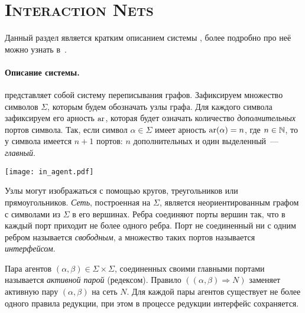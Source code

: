
\section{\texorpdfstring{\textsc{Interaction Nets}}{Interaction Nets}}
\label{sec:ins}

Данный раздел является кратким описанием системы \INs{}, более подробно про неё можно узнать в~\cite{lafontInteractionCombinators1997,satoDesignImplementationLowlevel2015, salikhmetovInteractionNetsRussian2013}.

\paragraph{Описание системы.}

\INs{} представляет собой систему переписывания графов.
Зафиксируем множество символов $\Sigma$, которым будем обозначать узлы графа.
Для каждого символа зафиксируем его арность $\operatorname{ar}$, которая будет означать количество \textit{дополнительных} портов символа.
Так, если символ $\alpha \in \Sigma$ имеет арность $\operatorname{ar}(\alpha) = n$, где $n \in \mathbb{N}$, то у символа имеется $n+1$ портов: $n$ дополнительных и один выделенный~--- \textit{главный}.

\begin{center}
    \texttt{[image: in\_agent.pdf]}
\end{center}

Узлы могут изображаться с помощью кругов, треугольников или прямоугольников.
\textit{Сеть}, построенная на $\Sigma$, является неориентированным графом с символами из $\Sigma$ в его вершинах.
Ребра соединяют порты вершин так, что в каждый порт приходит не более одного ребра.
Порт не соединенный ни с одним ребром называется \textit{свободным}, а множество таких портов называется \textit{интерфейсом}.

Пара агентов $(\alpha, \beta) \in \Sigma \times \Sigma$, соединенных своими главными портами называется \textit{активной парой} (редексом).
Правило $((\alpha, \beta) \Longrightarrow N)$ заменяет активную пару $(\alpha, \beta)$ на сеть $N$.
Для каждой пары агентов существует не более одного правила редукции, при этом в процессе редукции интерфейс сохраняется.

